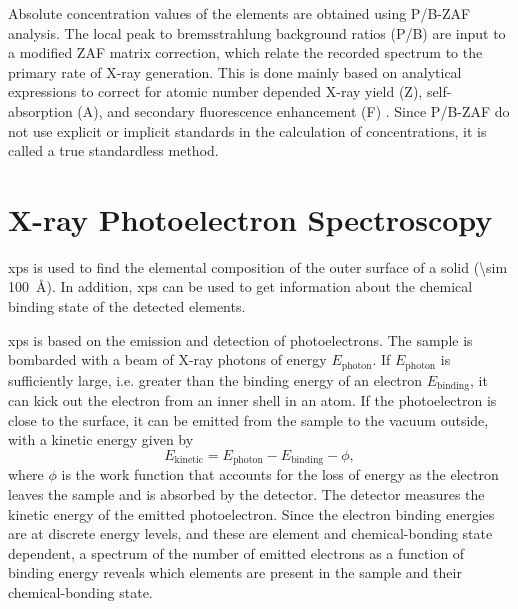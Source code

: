 Absolute concentration values of the elements are obtained using P/B-ZAF analysis. The local peak to bremsstrahlung background ratios (P/B) are input to a modified ZAF matrix correction, which relate the recorded spectrum to the primary rate of X-ray generation. This is done mainly based on analytical expressions to correct for atomic number depended X-ray yield (Z), self-absorption (A), and secondary fluorescence enhancement (F) \citep{quantax2008microanalysis}. Since P/B-ZAF do not use explicit or implicit standards in the calculation of concentrations, it is called a true standardless method.%


\section{X-ray Photoelectron Spectroscopy}\label{sec:xps}%
\Acf{xps} is used to find the elemental composition of the outer surface of a solid (\SI{\sim 100}{\angstrom}). In addition, \ac{xps} can be used to get information about the chemical binding state of the detected elements.

\Ac{xps} is based on the emission and detection of photoelectrons. The sample is bombarded with a beam of X-ray photons of energy $E_\text{photon}$. If $E_\text{photon}$ is sufficiently large, i.e. greater than the binding energy of an electron $E_\text{binding}$, it can kick out the electron from an inner shell in an atom. If the photoelectron is close to the surface, it can be emitted from the sample to the vacuum outside, with a kinetic energy given by
\begin{equation}
    E_\text{kinetic} = E_\text{photon} - E_\text{binding} - \phi,
\end{equation}
where $\phi$ is the work function that accounts for the loss of energy as the electron leaves the sample and is absorbed by the detector. The detector measures the kinetic energy of the emitted photoelectron. Since the electron binding energies are at discrete energy levels, and these are element and chemical-bonding state dependent, a spectrum of the number of emitted electrons as a function of binding energy reveals which elements are present in the sample and their chemical-bonding state.

